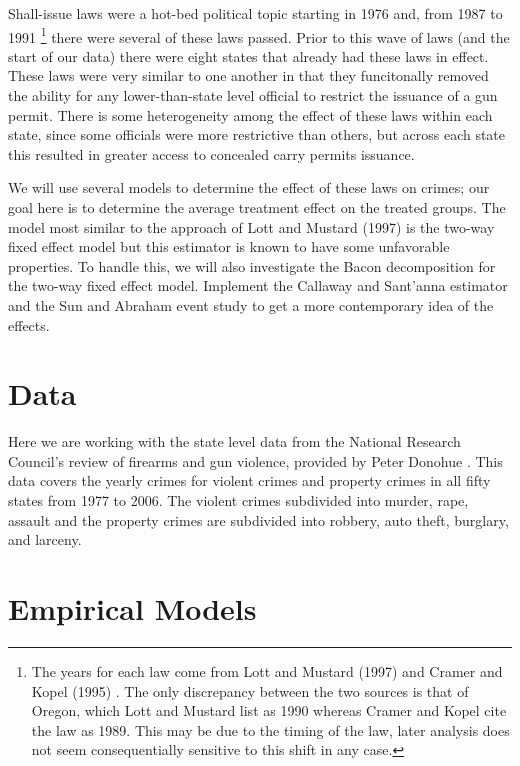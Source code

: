 \documentclass{article}
\begin{document}
Shall-issue laws were a hot-bed political topic starting in 1976 and, from 1987 to 1991
\footnote{The years for each law come from Lott and Mustard (1997) \cite{LottMustard} and Cramer and Kopel (1995) \cite{CramerKopel}. The only discrepancy between the two sources is that of Oregon, which Lott and Mustard list as 1990 whereas Cramer and Kopel cite the law as 1989. This may be due to the timing of the law, later analysis does not seem consequentially sensitive to this shift in any case.}
there were several of these laws passed. Prior to this wave of laws (and the start of our data) there were eight states that already had these laws in effect. These laws were very similar to one another in that they funcitonally removed the ability for any lower-than-state level official to restrict the issuance of a gun permit. There is some heterogeneity among the effect of these laws within each state, since some officials were more restrictive than others, but across each state this resulted in greater access to concealed carry permits issuance.

We will use several models to determine the effect of these laws on crimes; our goal here is to determine the average treatment effect on the treated groups. The model most similar to the approach of Lott and Mustard (1997) \cite{LottMustard} is the two-way fixed effect model but this estimator is known to have some unfavorable properties. To handle this, we will also investigate the Bacon decomposition \cite{Bacon} for the two-way fixed effect model.  Implement the Callaway and Sant'anna estimator \cite{CallawaySantanna} and the Sun and Abraham event study to get a more contemporary idea of the effects.

\section{Data}

Here we are working with the state level data from the National Research Council's review of firearms and gun violence, provided by Peter Donohue \cite{Donohue}. This data covers the yearly crimes for violent crimes and property crimes in all fifty states from 1977 to 2006. The violent crimes subdivided into murder, rape, assault and the property crimes are subdivided into robbery, auto theft, burglary, and larceny.





\section{Empirical Models}
\end{document}
